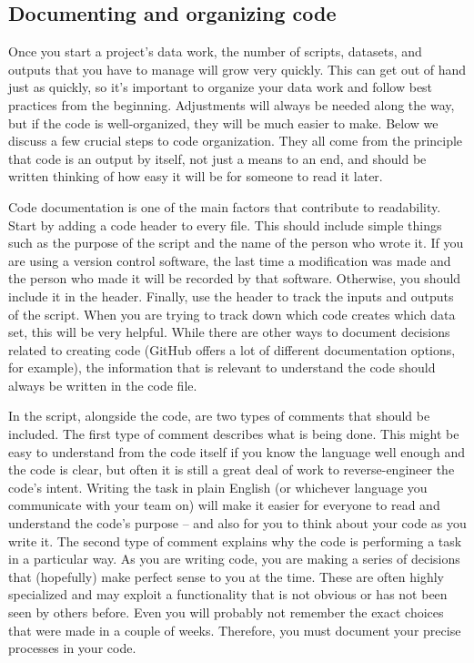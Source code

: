 \subsection{Documenting and organizing code}

Once you start a project's data work,
the number of scripts, datasets, and outputs that you have to manage will grow very quickly.
This can get out of hand just as quickly,
so it's important to organize your data work and follow best practices from the beginning.
Adjustments will always be needed along the way,
but if the code is well-organized, they will be much easier to make.
Below we discuss a few crucial steps to code organization.
They all come from the principle that code is an output by itself,
not just a means to an end,
and should be written thinking of how easy it will be for someone to read it later.

Code documentation is one of the main factors that contribute to readability.
Start by adding a code header to every file.
This should include simple things such as the purpose of the script and the name of the person who wrote it.
If you are using a version control software,
the last time a modification was made and the person who made it will be recorded by that software.
Otherwise, you should include it in the header.
Finally, use the header to track the inputs and outputs of the script.
When you are trying to track down which code creates which data set, this will be very helpful.
While there are other ways to document decisions related to creating code
(GitHub offers a lot of different documentation options, for example),
the information that is relevant to understand the code should always be written in the code file.

In the script, alongside the code, are two types of comments that should be included.
The first type of comment describes what is being done.
This might be easy to understand from the code itself
if you know the language well enough and the code is clear,
but often it is still a great deal of work to reverse-engineer the code's intent.
Writing the task in plain English (or whichever language you communicate with your team on)
will make it easier for everyone to read and understand the code's purpose
-- and also for you to think about your code as you write it.
The second type of comment explains why the code is performing a task in a particular way.
As you are writing code, you are making a series of decisions that
(hopefully) make perfect sense to you at the time.
These are often highly specialized and may exploit a functionality
that is not obvious or has not been seen by others before.
Even you will probably not remember the exact choices that were made in a couple of weeks.
Therefore, you must document your precise processes in your code.

